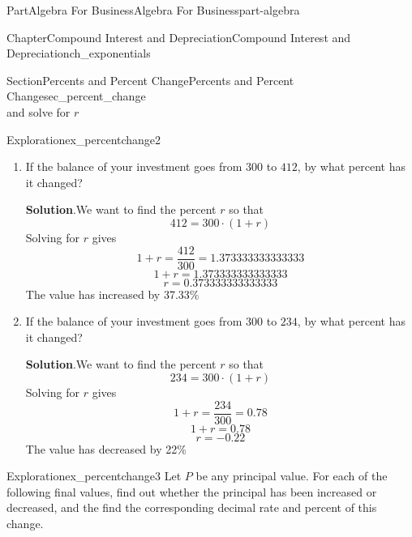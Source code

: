\documentclass[oneside,10pt,]{tufte-book}
\newcommand{\blocktitlefont}{\relax}
\numberwithin{equation}{chapter}
\begin{document}
\begin{partptx}{Part}{Algebra For Business}{}{Algebra For Business}{}{}{part-algebra}
\begin{chapterptx}{Chapter}{Compound Interest and Depreciation}{}{Compound Interest and Depreciation}{}{}{ch_exponentials}
\begin{sectionptx}{Section}{Percents and Percent Change}{}{Percents and Percent Change}{}{}{sec_percent_change}
\begin{equation*}
\end{equation*}
and solve for \(r\)%
\begin{exploration}{Exploration}{}{ex_percentchange2}%
\begin{enumerate}[font=\bfseries,label=(\alph*),ref=\alph*]%
\item{}If the balance of your investment goes from \textdollar{}\(300\) to \textdollar{}\(412\), by what percent has it changed?%
\par\smallskip%
\noindent\textbf{\blocktitlefont Solution}.\hypertarget{ex_percentchange2-1-2}{}\quad{}We want to find the percent \(r\) so that%
\begin{equation*}
412 = 300\cdot (1 + r) 
\end{equation*}
Solving for \(r\) gives%
\begin{equation*}
1 + r = \frac{412}{300}  = 1.373333333333333 
\end{equation*}
%
\begin{equation*}
1 + r = 1.373333333333333 
\end{equation*}
%
\begin{equation*}
r = 0.373333333333333
\end{equation*}
The value has increased by 37.33\%%
\item{}If the balance of your investment goes from \textdollar{}\(300\) to \textdollar{}\(234\), by what percent has it changed?%
\par\smallskip%
\noindent\textbf{\blocktitlefont Solution}.\hypertarget{ex_percentchange2-2-2}{}\quad{}We want to find the percent \(r\) so that%
\begin{equation*}
234 = 300\cdot (1 + r) 
\end{equation*}
Solving for \(r\) gives%
\begin{equation*}
1 + r = \frac{234}{300}  = 0.78 
\end{equation*}
%
\begin{equation*}
1 + r = 0.78 
\end{equation*}
%
\begin{equation*}
r = -0.22
\end{equation*}
The value has decreased by 22\%%
\end{enumerate}%
\end{exploration}%
\begin{exploration}{Exploration}{}{ex_percentchange3}%
Let \(P\) be any principal value. For each of the following final values, find out whether the principal has been increased or decreased, and the find the corresponding decimal rate and percent of this change.%

\end{exploration}
\end{sectionptx}
\end{chapterptx}
\end{partptx}
\end{document}
